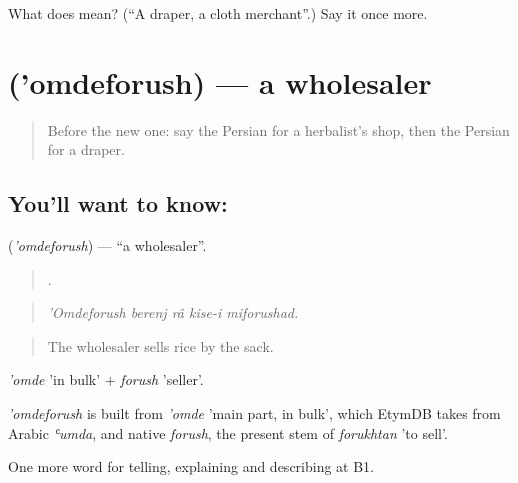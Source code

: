 \begin{tcolorbox}[breakable,colback=teal!4,colframe=teal!35!black,title={Before you move on}]
What does  mean? (\textquotedblleft{}A draper, a cloth merchant\textquotedblright{}.) Say it once more.
\end{tcolorbox}
\section[\texorpdfstring{\fa{عمده} \fa{فروش} ('omdeforush)}{عمده فروش ('omdeforush)}]{  ('omdeforush) — a wholesaler}

\label{lesson:FA-C458-omdeforush}



\begin{quote}
Before the new one: say the Persian for a herbalist's shop, then the Persian for a draper.
\end{quote}

\subsection*{You'll want to know:  }
\textbf{ } (\emph{'omdeforush}) — \textquotedblleft{}a wholesaler\textquotedblright{}.

\begin{quote}
      .
\end{quote}

\begin{quote}
\emph{'Omdeforush berenj râ kise-i miforushad.}
\end{quote}

\begin{quote}
The wholesaler sells rice by the sack.
\end{quote}

\emph{'omde} 'in bulk' + \emph{forush} 'seller'.

\begin{cousinweb}
\emph{'omdeforush} is built from \emph{'omde} 'main part, in bulk', which EtymDB takes from Arabic \emph{ʿumda}, and native \emph{forush}, the present stem of \emph{forukhtan} 'to sell'.
\end{cousinweb}

\begin{grammarlens}[title={What you've built}]
One more word for telling, explaining and describing at B1.
\end{grammarlens}

